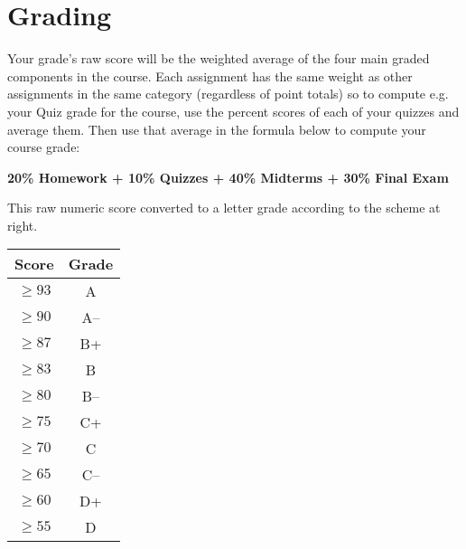 \documentclass[11pt,letterpaper]{article}
\begin{document}
\section*{Grading}
\parbox[b]{5.25in}{%
  Your grade's raw score will be the weighted average of the four main
  graded components in the course. Each assignment has the same weight as other assignments in the same category (regardless of point totals) so to compute e.g. your Quiz grade for the course, use the percent scores of each of your quizzes and average them. Then use that average in the formula below to compute your course grade:
  \begin{center}
  {\bf
      20\% Homework %
    + 10\% Quizzes
    + 40\% Midterms
    + 30\% Final Exam 

  }
  \end{center}
  This raw numeric score converted to a letter
  grade according to the scheme at right.  %
  }\hfill 
\parbox{1.4in}{%
  \vspace*{-2.1in}
  \begin{tabular}{cc}
    \toprule
    \textbf{Score} & \textbf{Grade} \\ \toprule
    $\ge 93$ & A \\
    $\ge 90$ & A--  \\ \midrule
    $\ge 87$ & B+ \\
    $\ge 83$ & B \\
    $\ge 80$ & B-- \\ \midrule
    $\ge 75$ & C+ \\
    $\ge 70$ & C \\
    $\ge 65$ & C-- \\ \midrule
    $\ge 60$ & D+  \\
    $\ge 55$ & D  \\
    \bottomrule
  \end{tabular}
}

\end{document}
